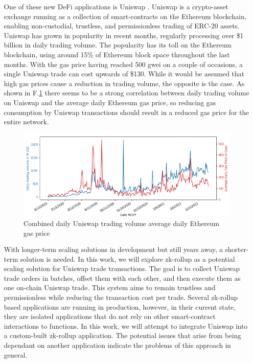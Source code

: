 \documentclass[../../thesis.tex]{subfiles}
\begin{document}
One of these new DeFi applications is Uniswap \cite{adams2020uniswap}. Uniswap is a crypto-asset exchange running as a collection of smart-contracts on the Ethereum blockchain, enabling non-custodial, trustless, and permissionless trading of ERC-20 assets. Uniswap has grown in popularity in recent months, regularly processing over \$1 billion in daily trading volume. The popularity has its toll on the Ethereum blockchain, using around 15\% of Ethereum block space throughout the last months. With the gas price having reached 500 gwei on a couple of occasions, a single Uniswap trade can cost upwards of \$130. While it would be assumed that high gas prices cause a reduction in trading volume, the opposite is the case. As shown in F.\ref{fig:gas_vol} there seems to be a strong correlation between daily trading volume on Uniswap and the average daily Ethereum gas price, so reducing gas consumption by Uniswap transactions should result in a reduced gas price for the entire network.

\begin{figure}[h]
    \centerline{\includegraphics[totalheight=5.6cm]{diagrams/gas_volume.png}}
    \caption{Combined daily Uniswap trading volume average daily Ethereum gas price}
    \label{fig:gas_vol}
\end{figure}


With longer-term scaling solutions in development but still years away, a shorter-term solution is needed. In this work, we will explore zk-rollup as a potential scaling solution for Uniswap trade transactions. The goal is to collect Uniswap trade orders in batches, offset them with each other, and then execute them as one on-chain Uniswap trade. This system aims to remain trustless and permissionless while reducing the transaction cost per trade. Several zk-rollup based applications are running in production, however, in their current state, they are isolated applications that do not rely on other smart-contract interactions to functions. In this work, we will attempt to integrate Uniswap into a custom-built zk-rollup application. The potential issues that arise from being dependant on another application indicate the problems of this approach in general. 
\end{document}
